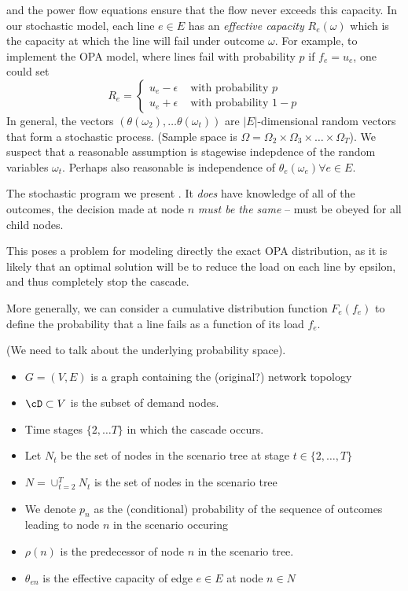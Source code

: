 and the power 
flow equations ensure that the flow never exceeds this capacity.  In
our stochastic model, each line $e \in E$ has an {\em effective
  capacity} $R_e(\omega)$ which is the capacity at which the
line will fail under outcome $\omega$.  For example, to implement the
OPA model, where lines fail with probability $p$ if $f_{e} = u_{e}$,
one could set
\[ 
R_e = \begin{cases} 
u_e - \epsilon & \mbox{ with probability } p\\
u_e + \epsilon & \mbox{ with probability } 1-p
\end{cases}
\]
In general, the vectors $(\theta(\omega_2), \ldots \theta(\omega_t))$
are $|E|$-dimensional random vectors that form a stochastic process.
(Sample space is $\Omega = \Omega_2 \times \Omega_3 \times \ldots
\times \Omega_T$).  We suspect that a reasonable assumption is
stagewise indepdence of the random variables $\omega_t$.  Perhaps also
reasonable is independence of $\theta_e(\omega_e) \forall e \in E$.

The stochastic program we present .  It {\em does} have knowledge of
all of the outcomes, the decision made at node $n$ {\em must be the
  same} -- must be obeyed for all child nodes.

This poses a problem for modeling directly the exact OPA distribution,
as it is likely that an optimal solution will be to reduce the load on
each line by epsilon, and thus completely stop the cascade.

More generally, we can consider a cumulative distribution function
$F_e(f_e)$ to define the probability that a line fails as a function of
its load $f_e$.




(We need to talk about the underlying probability space).





\begin{itemize}
\item $G=(V,E)$ is a graph containing the (original?) network topology
\item $\cD \subset V$ is the subset of demand nodes.
\item Time stages $\{2,\ldots T\}$ in which the cascade occurs.
\item Let $N_t$ be the set of nodes in the scenario tree at stage $t \in
\{2, \ldots, T\}$
\item $N = \cup_{t=2}^T N_t$ is the set of nodes in the scenario tree
\item We denote $p_n$ as the (conditional) probability of
the sequence of outcomes leading to node $n$ in the scenario occuring
\item $\rho(n)$ is the predecessor of node $n$ in the scenario tree.
\item $\theta_{en}$ is the effective capacity of edge $e \in E$ at
  node $n \in N$
\end{itemize}




